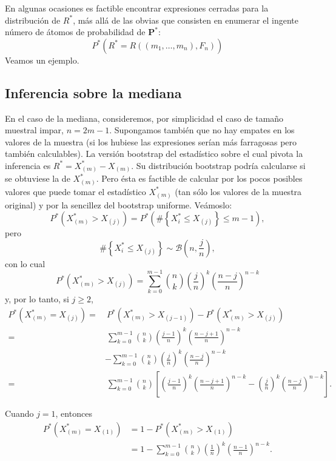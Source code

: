 \documentclass[]{book}
\theoremstyle{break}
\theoremstyle{definition}
\theoremstyle{definition}
\theoremstyle{definition}
\theoremstyle{remark}
\begin{document}
En algunas ocasiones es factible encontrar expresiones cerradas para la
distribución de \(R^{\ast}\), más allá de las obvias que consisten en
enumerar el ingente número de átomos de probabilidad de
\(\mathbf{P}^{\ast}\):
\[P^{\ast}\left( R^{\ast}=R\left( \left( m_1,\ldots ,m_n \right)
,F_n \right) \right)\] Veamos un ejemplo.

\subsection{Inferencia sobre la
mediana}\label{inferencia-sobre-la-mediana}

En el caso de la mediana, consideremos, por simplicidad el caso de
tamaño muestral impar, \(n=2m-1\). Supongamos también que no hay empates
en los valores de la muestra (si los hubiese las expresiones serían más
farragosas pero también calculables). La versión bootstrap del
estadístico sobre el cual pivota la inferencia es
\(R^{\ast}=X_{\left( m \right)}^{\ast}-X_{(m)}\). Su distribución
bootstrap podría calcularse si se obtuviese la de \(X_{(m)}^{\ast}\).
Pero ésta es factible de calcular por los pocos posibles valores que
puede tomar el estadístico \(X_{(m)}^{\ast}\) (tan sólo los valores de
la muestra original) y por la sencillez del bootstrap uniforme.
Veámoslo: \[P^{\ast}\left( X_{(m)}^{\ast}>X_{(j)} \right)
=P^{\ast}\left( \#\left\{ X_i^{\ast}\leq X_{(j)}\right\}
\leq m-1 \right),\] pero
\[\#\left\{ X_i^{\ast}\leq X_{(j)}\right\} \sim \mathcal{B}\left(
n,\frac{j}{n} \right),\] con lo cual
\[P^{\ast}\left( X_{(m)}^{\ast}>X_{(j)} \right)
=\sum_{k=0}^{m-1}\binom{n}{k}\left( \frac{j}{n} \right)^{k}
\left( \frac{n-j}{n} \right)^{n-k}\] y, por lo tanto, si \(j\geq 2\),
\[\begin{aligned}
P^{\ast}\left( X_{(m)}^{\ast}=X_{(j)} \right)
=&\ P^{\ast}\left( X_{(m)}^{\ast}>X_{\left( j-1 \right)} \right)
-P^{\ast}\left( X_{(m)}^{\ast}>X_{(j)} \right) \\
=&\ \sum_{k=0}^{m-1}\binom{n}{k}\left( \frac{j-1}{n} \right)^{k}\left( \frac{
n-j+1}{n} \right)^{n-k} \\
&-\sum_{k=0}^{m-1}\binom{n}{k}\left( \frac{j}{n} \right)^{k}\left( \frac{n-j}{
n} \right)^{n-k} \\
=&\ \sum_{k=0}^{m-1}\binom{n}{k}\left[ \left( \frac{j-1}{n} \right)^{k}\left( 
\frac{n-j+1}{n} \right)^{n-k}-\left( \frac{j}{n} \right)^{k}\left( \frac{n-j
}{n} \right)^{n-k}\right] .
\end{aligned}\]

Cuando \(j=1\), entonces \[\begin{aligned}
P^{\ast}\left( X_{(m)}^{\ast} = X_{(1)} \right)
&= 1-P^{\ast}\left( X_{(m)}^{\ast}>X_{(1)} \right) \\
&=  1-\sum_{k=0}^{m-1}\binom{n}{k}\left( \frac{1}{n} \right)^{k}
\left( \frac{n-1}{n} \right)^{n-k}.
\end{aligned}\]
\end{document}

